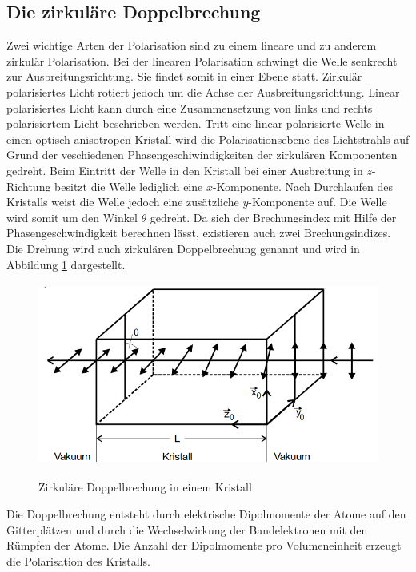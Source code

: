 \subsection{Die zirkuläre Doppelbrechung}
Zwei wichtige Arten der Polarisation sind zu einem lineare und zu anderem
zirkulär Polarisation. Bei der linearen Polarisation schwingt die Welle
senkrecht zur Ausbreitungsrichtung. Sie findet somit in einer Ebene statt.
Zirkulär polarisiertes Licht rotiert jedoch um die Achse der
Ausbreitungsrichtung. Linear polarisiertes Licht kann durch eine Zusammensetzung
von links und rechts polarisiertem Licht beschrieben werden.
Tritt eine linear polarisierte Welle in einen optisch anisotropen Kristall
wird die Polarisationsebene des Lichtstrahls auf Grund der veschiedenen
Phasengeschiwindigkeiten der zirkulären Komponenten gedreht.
Beim Eintritt der Welle in den Kristall bei einer Ausbreitung in $z$-Richtung
besitzt die Welle lediglich eine $x$-Komponente. Nach Durchlaufen des Kristalls
weist die Welle jedoch eine zusätzliche $y$-Komponente auf. Die Welle wird somit
um den Winkel $\theta$ gedreht. Da sich der Brechungsindex mit Hilfe der
Phasengeschwindigkeit berechnen lässt, existieren auch zwei Brechungsindizes.
Die Drehung wird auch zirkulären Doppelbrechung genannt und wird in
Abbildung \ref{fig:rotation} dargestellt.

\begin{figure}[H]
  \centering
  \includegraphics[width=12cm, height=6cm]{rotation.png}
  \caption{Zirkuläre Doppelbrechung in einem Kristall}
  \label{fig:rotation}
  \cite{skript}
\end{figure}


Die Doppelbrechung entsteht durch elektrische Dipolmomente der Atome auf den
Gitterplätzen und durch die Wechselwirkung der Bandelektronen mit den Rümpfen der
Atome. Die Anzahl der Dipolmomente pro Volumeneinheit erzeugt die Polarisation
des Kristalls.

